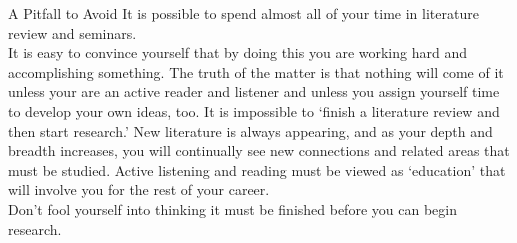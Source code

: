 \begin{frame}{A Pitfall to Avoid}
  It is possible to spend almost all of your time in literature review and seminars.\\

  It is easy to convince yourself that by doing this you are working hard and
  accomplishing something. The truth of the matter is that nothing will come of
  it unless your are an active reader and listener and unless you assign yourself
  time to develop your own ideas, too. It is impossible to `finish a literature
  review and then start research.' New literature is always appearing, and as
  your depth and breadth increases, you will continually see new connections and
  related areas that must be studied. Active listening and reading must be viewed
  as `education' that will involve you for the rest of your career.\\

  Don't fool yourself into thinking it must be finished before you can begin research.
\end{frame}
